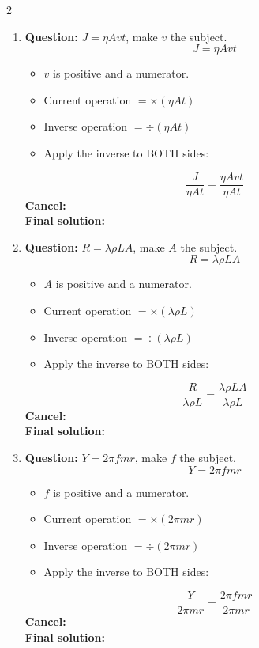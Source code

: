 \documentclass[11pt]{article}
\begin{document}
\begin{multicols}{2}
\begin{enumerate}[leftmargin=*, itemsep=10pt]
\item \textbf{Question:} \( J = \eta Avt \), make \( v \) the subject.
\[
J=\eta Avt
\]
\begin{itemize}[leftmargin=*, itemsep=2pt]
\item \(v\) is positive and a numerator.
\item Current operation \(= \times (\eta At)\)
\item Inverse operation \(= \div (\eta At)\)
\item Apply the inverse to BOTH sides:
\end{itemize}
\[
\frac{J}{\eta At}=\frac{\eta Avt}{\eta At}
\]
\textbf{Cancel:} \\[1.5cm]
\textbf{Final solution:}\\[1.5cm]

\columnbreak
\item \textbf{Question:} \( R = \lambda \rho LA \), make \( A \) the subject.
\[
R=\lambda \rho LA
\]
\begin{itemize}[leftmargin=*, itemsep=2pt]
\item \(A\) is positive and a numerator.
\item Current operation \(= \times (\lambda \rho L)\)
\item Inverse operation \(= \div (\lambda \rho L)\)
\item Apply the inverse to BOTH sides:
\end{itemize}
\[
\frac{R}{\lambda \rho L}=\frac{\lambda \rho LA}{\lambda \rho L}
\]
\textbf{Cancel:} \\[1.5cm]
\textbf{Final solution:}\\[1.5cm]

\item \textbf{Question:} \( Y = 2\pi fmr \), make \( f \) the subject.
\[
Y=2\pi fmr
\]
\begin{itemize}[leftmargin=*, itemsep=2pt]
\item \(f\) is positive and a numerator.
\item Current operation \(= \times (2\pi mr)\)
\item Inverse operation \(= \div (2\pi mr)\)
\item Apply the inverse to BOTH sides:
\end{itemize}
\[
\frac{Y}{2\pi mr}=\frac{2\pi fmr}{2\pi mr}
\]
\textbf{Cancel:} \\[1.5cm]
\textbf{Final solution:}\\[1.5cm]


\end{enumerate}
\end{multicols}
\end{document}
